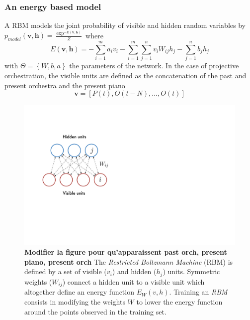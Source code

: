 \documentclass{article}
\begin{document}
\subsubsection{An energy based model}
A RBM models the joint probability of visible and hidden random variables by $p_{model}(\bm{v},\bm{h}) = \frac{\exp^{-E(\bm{v},\bm{h})}}{Z}$ where
\begin{equation}
\label{eq:energy}
E(\bm{v},\bm{h}) = - \sum_{i=1}^{m} a_{i} v_{i}  - \sum_{i=1}^{m} \sum_{j=1}^{n} v_{i} W_{ij} h_{j} - \sum_{j = 1}^{n} b_{j} h_{j}
\end{equation}
with $\Theta = \left\{W,b,a\right\}$ the parameters of the network.
In the case of projective orchestration, the visible units are defined as the concatenation of the past and present orchestra and the present piano 
\begin{equation}
\label{eq:visible_rbm}
\bm{v} = \left[P(t),O(t-N),...,O(t)\right]
\end{equation}

\begin{figure}[h]
\centering
\includegraphics[scale=0.6]{RBM}
\caption{\textbf{Modifier la figure pour qu'apparaissent past orch, present piano, present orch}
The \textit{Restricted Boltzmann Machine} (RBM) is defined by a set of visible ($v_{i}$) and hidden ($h_{j}$) units. Symmetric weights ($W_{ij}$) connect a hidden unit to a visible unit which altogether define an energy function $E_{W}(v,h)$. Training an \textit{RBM} consists in modifying the weights $W$ to lower the energy function around the points observed in the training set.}
\label{fig:RBM}
\end{figure}
\end{document}
